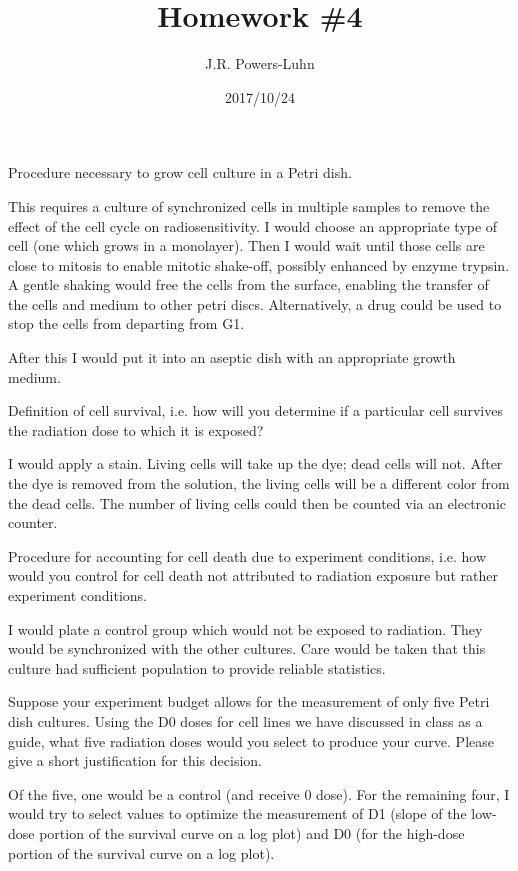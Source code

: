 \documentclass{hw}
\author{J.R. Powers-Luhn}
\date{2017/10/24}
\title{Homework \#4}
\begin{document}

\problem{}
Procedure necessary to grow cell culture in a Petri dish.

\solution
This requires a culture of synchronized cells in multiple samples to remove the effect of the cell cycle on radiosensitivity. I would choose an appropriate type of cell (one which grows in a monolayer). Then I would wait until those cells are close to mitosis to enable mitotic shake-off, possibly enhanced by enzyme trypsin. A gentle shaking would free the cells from the surface, enabling the transfer of the cells and medium to other petri discs. Alternatively, a drug could be used to stop the cells from departing from G1.

After this I would put it into an aseptic dish with an appropriate growth medium.

\problem{}
Definition of cell survival, i.e. how will you determine if a particular cell survives the radiation dose to which it is exposed?

\solution
I would apply a stain. Living cells will take up the dye; dead cells will not. After the dye is removed from the solution, the living cells will be a different color from the dead cells. The number of living cells could then be counted via an electronic counter.

\problem{}
Procedure for accounting for cell death due to experiment conditions, i.e. how would you control for cell death not attributed to radiation exposure but rather experiment conditions.

\solution
I would plate a control group which would not be exposed to radiation. They would be synchronized with the other cultures. Care would be taken that this culture had sufficient population to provide reliable statistics.

\problem{}
Suppose your experiment budget allows for the measurement of only five Petri dish cultures. Using the D0 doses for cell lines we have discussed in class as a guide, what five radiation doses would you select to produce your curve. Please give a short justification for this decision.

\solution
Of the five, one would be a control (and receive 0 dose). For the remaining four, I would try to select values to optimize the measurement of D1 (slope of the low-dose portion of the survival curve on a log plot) and D0 (for the high-dose portion of the survival curve on a log plot).
\end{document}
